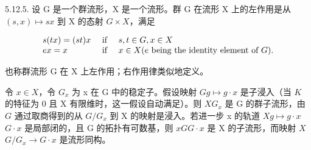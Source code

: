 5.12.5. 设 G 是一个群流形，X 是一个流形。群 G 在流形 X 上的左作用是从 \((s, x) \mapsto sx\) 到 X 的态射 \(G \times X\)，满足

\[
\begin{array}{l l} s (t x) = (s t) x & \text { if } \quad s, t \in G, x \in X \\ e x = x & \text { if } \quad x \in X (e \text { being   the   identity   element   of } G). \end{array}
\]

也称群流形 G 在 X 上左作用；右作用律类似地定义。

令 \(x \in X\)，令 \(G_x\) 为 x 在 G 中的稳定子。假设映射 \(G\)\(g \mapsto g \cdot x\) 是子浸入（当 \(K\) 的特征为 0 且 X 有限维时，这一假设自动满足）。则 \(X\)\(G_x\) 是 G 的群子流形，由 \(G\) 通过取商得到的从 \(G/G_x\) 到 X 的映射是浸入。若进一步 x 的轨道 \(X\)\(g \mapsto g \cdot x\)\(G \cdot x\) 是局部闭的，且 G 的拓扑有可数基，则 \(x\)\(G\)\(G \cdot x\) 是 X 的子流形，而映射 \(X\)\(G/G_x \to G \cdot x\) 是流形同构。

